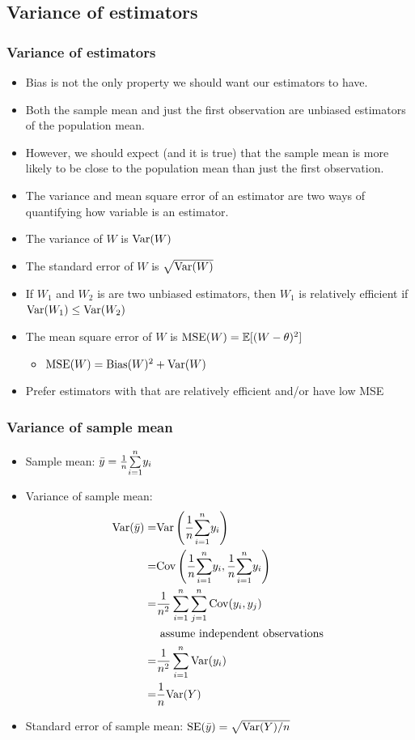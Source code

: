 \subsection{Variance of estimators}
\begin{frame}[allowframebreaks]
  \frametitle{Variance of estimators}
  \begin{itemize}
\item Bias is not the only property we should want our estimators to
  have. 
\item Both
the sample mean and just the first observation are unbiased estimators
of the population mean. 
\item However, we should expect (and it is true)
that the sample mean is more likely to be close to the population mean
than just the first observation. 
\item The variance and mean square
error of an estimator are two ways of quantifying how variable is an
estimator.
\framebreak

  \item The \alert{variance} of $W$ is $\mathrm{Var}(W)$
  \item The \alert{standard error} of $W$ is $\sqrt{\mathrm{Var}(W)}$
  \item If $W_1$ and $W_2$ is are two unbiased estimators, then $W_1$
    is relatively efficient if $\mathrm{Var}(W_1) \leq \mathrm{Var}(W_2)$
  \item The \alert{mean square error} of $W$ is $\mathrm{MSE}(W) =
    \mathbb{E}[(W-\theta)^2]$
    \begin{itemize}
    \item $\mathrm{MSE}(W) = \mathrm{Bias}(W)^2 + \mathrm{Var}(W)$
    \end{itemize}
  \item Prefer estimators with that are relatively efficient and/or
    have low MSE
  \end{itemize}
\end{frame}

\begin{frame}[allowframebreaks]\frametitle{Variance of sample mean}
  \begin{itemize}
  \item Sample mean: $\bar{y} = \frac{1}{n} \underset{i=1}{\overset{n}{\sum}} y_i$
  \item Variance of sample mean:
    \begin{align*}
      \mathrm{Var}(\bar{y}) = & \mathrm{Var}\left(\frac{1}{n} \underset{i=1}{\overset{n}{\sum}} y_i \right) \\
      = & \mathrm{Cov}\left(\frac{1}{n} \underset{i=1}{\overset{n}{\sum}} y_i , \frac{1}{n} \underset{i=1}{\overset{n}{\sum}} y_i \right) \\
      = & \frac{1}{n^2} \sum_{i=1}^n \sum_{j=1}^n \mathrm{Cov}(y_i, y_j)  \\
                      & \text{  assume independent observations } \\
      = & \frac{1}{n^2} \sum_{i=1}^n \mathrm{Var}(y_i) \\
      = & \frac{1}{n} \mathrm{Var}(Y)
    \end{align*}
  \item Standard error of sample mean: $\mathrm{SE}(\bar{y}) = \sqrt{\mathrm{Var}(Y)/n}$
  \end{itemize}
\end{frame}


